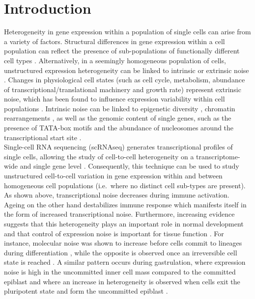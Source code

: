 
\section{Introduction}

Heterogeneity in gene expression within a population of single cells can arise from a variety of factors. Structural differences in gene expression within a cell population can reflect the presence of sub-populations of functionally different cell types \citep{Zeisel2015, Paul2015}. Alternatively, in a seemingly homogeneous population of cells,  unstructured expression heterogeneity can be linked to intrinsic or extrinsic noise \citep{Elowitz2002}. Changes in physiological cell states (such as cell cycle, metabolism, abundance of transcriptional/translational machinery and growth rate) represent extrinsic noise, which has been found to influence expression variability within cell populations \citep{Keren2015, Buettner2015, Zeng2017}. Intrinsic noise can be linked to epigenetic diversity \citep{Smallwood2014}, chromatin rearrangements \citep{Buenrostro2015}, as well as the genomic content of single genes, such as the presence of TATA-box motifs and the abundance of nucleosomes around the transcriptional start site \citep{Hornung2012}.  \\ 

Single-cell RNA sequencing (scRNAseq) generates transcriptional profiles of single cells, allowing the study of cell-to-cell heterogeneity on a transcriptome-wide \citep{Grun2014} and single gene level \citep{Goolam2016}. Consequently, this technique can be used to study unstructured cell-to-cell variation in gene expression within and between homogeneous cell populations (i.e.~where no distinct cell sub-types are present). As shown above, transcriptional noise decreases during immune activation. Ageing on the other hand destabilizes immune response which manifests itself in the form of increased transcriptional noise. Furthermore, increasing evidence suggests that this heterogeneity plays an important role in normal development \citep{Chang2008} and that control of expression noise is important for tissue function \citep{BaharHalpern2015}. For instance, molecular noise was shown to increase before cells commit to lineages during differentiation \citep{Mojtahedi2016}, while the opposite is observed once an irreversible cell state is reached \citep{Richard2016}. A similar pattern occurs during gastrulation, where expression noise is high in the uncommitted inner cell mass compared to the committed epiblast and where an increase in heterogeneity is observed when cells exit the pluripotent state and form the uncommitted epiblast \citep{Mohammed2017}. \\

